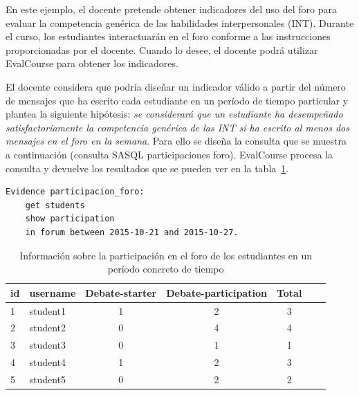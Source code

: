 			En este ejemplo, el docente pretende obtener indicadores del uso del foro para evaluar la competencia genérica de las habilidades interpersonales (INT). Durante el curso, los estudiantes interactuarán en el foro conforme a las instrucciones proporcionadas por el docente. Cuando lo desee, el docente podrá utilizar EvalCourse para obtener los indicadores.


			El docente considera que podría diseñar un indicador válido a partir del número de mensajes que ha escrito cada estudiante en un período de tiempo particular y plantea la siguiente hipótesis: \emph{se considerará que un estudiante ha desempeñado satisfactoriamente la competencia genérica de las INT si ha escrito al menos dos mensajes en el foro en la semana}. Para ello se diseña la consulta que se muestra a continuación (consulta SASQL participaciones foro). EvalCourse procesa la consulta y devuelve los resultados que se pueden ver en la tabla~\ref{tab:EvalCourseEj1}.






\begin{verbatim}
Evidence participacion_foro: 
	get students
	show participation
	in forum between 2015-10-21 and 2015-10-27.
\end{verbatim}


\begin{table}
	\centering
	\caption{Información sobre la participación en el foro de los estudiantes en un período concreto de tiempo}
	\label{tab:EvalCourseEj1}
	\begin{tabular}{|l|l|c|c|c|c|c|}
		\hline
		id & username & Debate-starter & Debate-participation & Total \\
		\hline
		\hline
		1 & student1 & 1 & 2 & 3  \\
		\hline
		2 & student2 & 0 & 4 & 4  \\
		\hline
		3 & student3 & 0 & 1 & 1  \\
		\hline
		4 & student4 & 1 & 2 & 3  \\
		\hline
		5 & student5 & 0 & 2 & 2  \\
		\hline
	\end{tabular}
\end{table}


